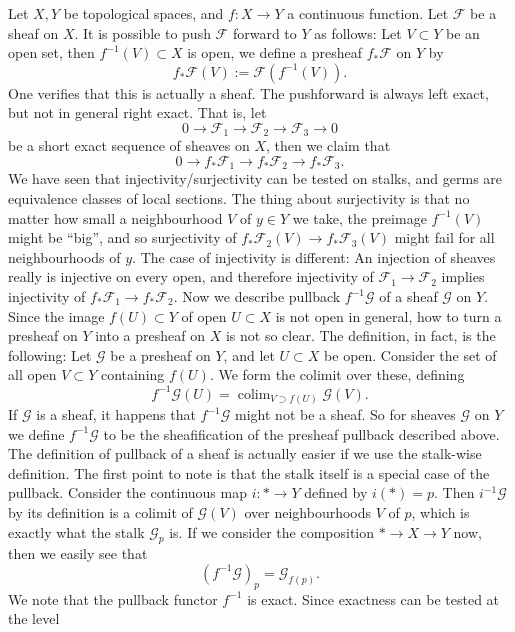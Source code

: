 Let $X,Y$ be topological spaces, and $f:X\to Y$ a continuous function. Let $\mathcal F$ be a sheaf
on $X$. It is possible to push $\mathcal F$ forward to $Y$ as follows: Let $V\subset Y$ be an open set, then
$f^{-1}(V)\subset X$ is open, we define a presheaf $f_*\mathcal F$ on $Y$ by
\[
f_*\mathcal F(V):=\mathcal F(f^{-1}(V)).
\]
\label{definition-pushforward}
One verifies that this is actually a sheaf.
The pushforward is always left exact, but not in general right exact. That is, let
\[
0\to\mathcal F_1\to\mathcal F_2\to\mathcal F_3\to0
\]
be a short exact sequence of sheaves on $X$, then we claim that
\[
0\to f_*\mathcal F_1\to f_*\mathcal F_2\to f_*\mathcal F_3.
\]
We have seen that injectivity/surjectivity can be tested on stalks, and germs are equivalence
classes of local sections. The thing about surjectivity is that no matter how small a neighbourhood
$V$ of $y\in Y$ we take, the preimage $f^{-1}(V)$ might be “big”, and so surjectivity
of $f_*\mathcal F_2(V)\to f_*\mathcal F_3(V)$ might fail for all neighbourhoods of $y$. The case of injectivity is
different: An injection of sheaves really is injective on every open, and therefore injectivity
of $\mathcal F_1\to\mathcal F_2$ implies injectivity of $f_*\mathcal F_1\to f_*\mathcal F_2$.
Now we describe pullback $f^{-1}\mathcal G$ of a sheaf $\mathcal G$ on $Y$. Since the image $f(U)\subset Y$ of open
$U\subset X$ is not open in general, how to turn a presheaf on $Y$ into a presheaf on $X$ is not so
clear. The definition, in fact, is the following: Let $\mathcal G$ be a presheaf on $Y$, and let $U\subset X$ be
open. Consider the set of all open $V\subset Y$ containing $f(U)$. We form the colimit over these,
defining
\[
f^{-1}\mathcal G(U)=\operatorname{colim}_{V\supset f(U)}\mathcal G(V).
\tag{5.3.1}
\]
If $\mathcal G$ is a sheaf, it happens that $f^{-1}\mathcal G$ might not be a sheaf. So for sheaves $\mathcal G$ on $Y$ we define
$f^{-1}\mathcal G$ to be the sheafification of the presheaf pullback described above.
\label{definition-pullback}
The definition of pullback of a sheaf is actually easier if we use the stalk-wise definition.
The first point to note is that the stalk itself is a special case of the pullback. Consider the
continuous map $i:*\to Y$ defined by $i(*)=p$. Then $i^{-1}\mathcal G$ by its definition is a colimit of
$\mathcal G(V)$ over neighbourhoods $V$ of $p$, which is exactly what the stalk $\mathcal G_p$ is.
If we consider the composition $*\to X\to Y$ now, then we easily see that
\[
(f^{-1}\mathcal G)_p=\mathcal G_{f(p)}.
\]
We note that the pullback functor $f^{-1}$ is exact. Since exactness can be tested at the level
